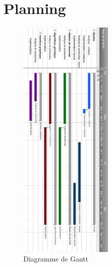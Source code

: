 \chapter{Planning}


\begin{figure}[H]
    \centering
    \includegraphics[width=0.4\textwidth]{./pictures/gantt.png}
    \caption{Diagramme de Gantt}
\end{figure}

\pagebreak

